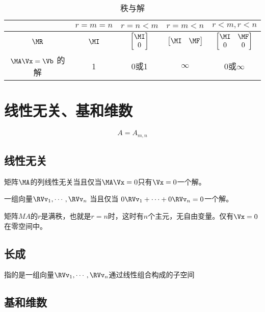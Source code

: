 \begin{table}[!ht]
    \centering
    \caption{秩与解}
    \label{table:rank}
    {\renewcommand{\arraystretch}{2}
    \begin{tabular}{|c|c|c|c|c|}
        \hline
         & $r = m = n$ & $r = n < m$ & $r = m < n$ & $r<m, r < n$ \\ \hline
        $\MR$ & $\MI$ & $\begin{bmatrix} \MI \\ 0 \\ \end{bmatrix}$ & $\begin{bmatrix} \MI & \MF \\ \end{bmatrix}$ & $\begin{bmatrix} \MI & \MF \\ 0 & 0 \\ \end{bmatrix}$ \\
         $\MA\Vx = \Vb$ 的解 & 1 & 0或1 & $\infty$ & 0或$\infty$ \\
        \hline
    \end{tabular}}
\end{table}


\section{线性无关、基和维数}

$$A = A_{m,n}$$

\subsection{线性无关}

 矩阵$\MA$的列线性无关当且仅当$\MA \Vx = 0$只有$\Vx = 0$一个解。

一组向量$\RVv_1, \cdots, \RVv_n$ 当且仅当 $0\RVv_1 + \cdots + 0\RVv_n = 0$一个解。

矩阵$MA$的$r$是满秩，也就是$r = n$时，这时有$n$个主元，无自由变量。仅有$\Vx = 0$在零空间中。

\subsection{长成}

 指的是一组向量$\RVv_1, \cdots, \RVv_n$通过线性组合构成的子空间

\subsection{基和维数}

